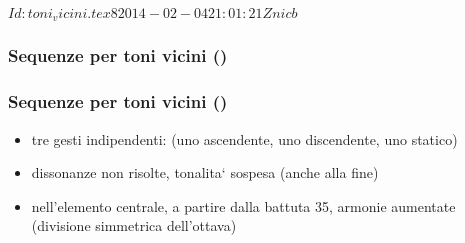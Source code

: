 %
%
\svnInfo $Id: toni_vicini.tex 8 2014-02-04 21:01:21Z nicb $

\setcounter{ms}{0}
\begin{frame}
    \frametitle{Sequenze per toni vicini ()}

    \begin{center}
        \begin{figure}
            \caption{}
        \end{figure}
    \end{center}

\end{frame}

\begin{frame}
    \frametitle{Sequenze per toni vicini ()}

    \begin{itemize}
        \item tre gesti indipendenti:
            (uno ascendente, uno discendente, uno statico)
        \item dissonanze non risolte, tonalita` sospesa (anche alla fine)
        \item nell'elemento centrale, a partire dalla battuta 35, armonie aumentate
            (divisione simmetrica dell'ottava)
    \end{itemize}

\end{frame}

